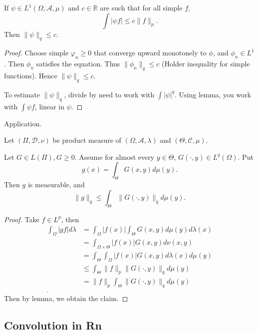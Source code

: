 
\begin{lemma}
	If $\psi \in L^1(\Omega, \mathcal{A}, \mu)$ and $c \in \mathbb{R}$ are such that for all simple $f$,
	\[
		\int |\psi f| \le  c \| f\|_p
	.\] 
	Then $\|\psi\|_q \le c$.
\end{lemma}
\begin{proof}
	Choose simple $\varphi_n\ge 0$ that converge upward monotonely to $\phi$, and  $\phi_n \in L^1$. Then $\phi_n$ satisfies the equation. Thus $\|\phi_n\|_q \le c$ (Holder inequality for simple functions). Hence $\|\psi\|_q\le c$. 

	To estimate $\|\psi\|_q$, divide by need to work with $\int |\psi|^q$. Using lemma, you work with $\int \psi f$, linear in $\psi$.
\end{proof}

Application.

Let $(\Pi, \mathcal{D}, \nu)$ be product measure of $(\Omega, \mathcal{A}, \lambda)$ and $(\Theta, \mathcal{C}, \mu)$.

\begin{theorem}
	Let $G \in L(\Pi), G \ge 0$. Assume for almost every $y \in \Theta$, $G(\cdot, y) \in L^q(\Omega)$. Put
	\[
		g(x) = \int _\Theta G(x,y) d \mu(y)
	.\] 
	Then
	$g$ is measurable, and
	\[
		\|g\|_q \le \int _\Theta \|G(\cdot, y)\|_q d \mu(y)
	.\] 
\end{theorem}
\begin{proof}
	Take $f \in L^p$, then
	\begin{align*}
		\int _\Omega |g f | d \lambda
		&= \int _\Omega |f(x)| \int _\Theta G(x,y) d \mu(y) d \lambda(x) \\
		&= \int _{\Omega \times \Theta} |f(x)| G(x,y) d\nu(x,y) \\
		&= \int _\Theta \int _\Omega |f(x)| G(x,y) d\lambda(x) d \mu(y) \\
		&\le \int _\Theta \|f\|_p \|G(\cdot, y)\|_q  d \mu(y)\\
		&= \|f\|_p  \int _\Theta \|G(\cdot, y)\|_q d \mu(y)\\
	.\end{align*} 
	Then by lemma, we obtain the claim.
\end{proof}

\subsection{Convolution in Rn}

